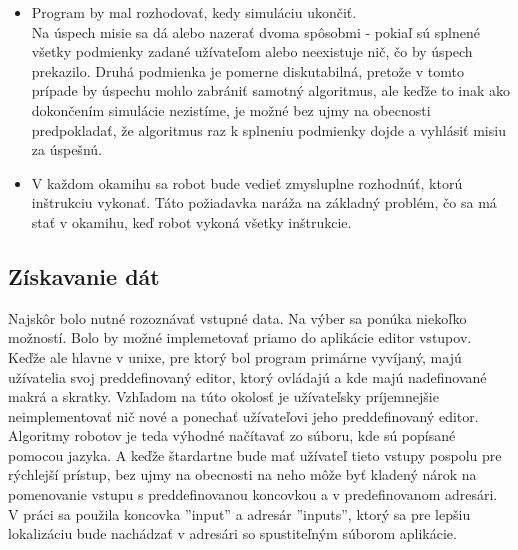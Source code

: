 \begin {itemize}
	Do úvahy boli zobraté najčastejšie verzie úloh z RPG a bojových hier. To sú napríklad vykonanie akcie v nejakej lokácií, ( akcia sa môže líšiť v každej hre), odmedzenie na počet zabitých nepriateľov, ako je to napríklad v hre Thief, a zameranie sa na určitého neprateľa. Tento cieľ sa vyskytol vo viacerých hrách, ako reprezentanta môžeme uviesť napríklad Baldurs gate.
\item Program by mal rozhodovať, kedy simuláciu ukončiť.\\
	Na úspech misie sa dá alebo nazerať dvoma spôsobmi - pokiaľ sú splnené všetky podmienky zadané užívateľom alebo neexistuje nič, čo by úspech prekazilo. Druhá podmienka je pomerne diskutabilná, pretože v tomto prípade by úspechu mohlo zabrániť samotný algoritmus, ale keďže to inak ako dokončením simulácie nezistíme, je možné bez ujmy na obecnosti predpokladať, že algoritmus raz k splneniu podmienky dojde a vyhlásiť misiu za úspešnú.
\item V každom okamihu sa robot bude vedieť zmysluplne rozhodnúť, ktorú inštrukciu vykonať. Táto požiadavka naráža na základný problém, čo sa má stať v okamihu, keď robot vykoná všetky inštrukcie. 
\end{itemize}

\subsection {Získavanie dát}
\indent Najskôr bolo nutné rozoznávať vstupné data. Na výber sa ponúka niekoľko možností. Bolo by možné implemetovať priamo do aplikácie editor vstupov. Keďže ale hlavne v unixe, pre ktorý bol program primárne vyvíjaný, majú užívatelia svoj preddefinovaný editor, ktorý ovládajú a kde majú nadefinované makrá a skratky. Vzhľadom na túto okolosť je užívateľsky príjemnejšie neimplementovať nič nové a ponechať užívateľovi jeho preddefinovaný editor.\\
Algoritmy robotov je teda výhodné načítavať zo súboru, kde sú popísané pomocou jazyka. A keďže štardartne bude mať užívateľ tieto vstupy pospolu pre rýchlejší prístup, bez ujmy na obecnosti na neho môže byť kladený nárok na pomenovanie vstupu s preddefinovanou koncovkou a v predefinovanom adresári. V práci sa použila koncovka ''input'' a adresár ''inputs'', ktorý sa pre lepšiu lokalizáciu bude nachádzať v adresári so spustiteľným súborom aplikácie.

